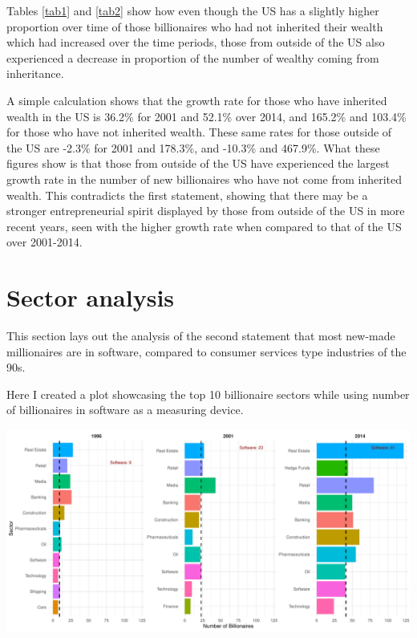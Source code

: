 \documentclass[11pt,preprint]{elsarticle}
\let\origfigure\figure
\let\endorigfigure\endfigure
\renewenvironment{figure}[1][2] {
    \expandafter\origfigure\expandafter[H]
} {
    \endorigfigure
}
\numberwithin{equation}{section}
\numberwithin{figure}{section}
\numberwithin{table}{section}
\begin{document}
Tables \ref{tab1} and \ref{tab2} show how even though the US has a
slightly higher proportion over time of those billionaires who had not
inherited their wealth which had increased over the time periods, those
from outside of the US also experienced a decrease in proportion of the
number of wealthy coming from inheritance.

A simple calculation shows that the growth rate for those who have
inherited wealth in the US is 36.2\% for 2001 and 52.1\% over 2014, and
165.2\% and 103.4\% for those who have not inherited wealth. These same
rates for those outside of the US are -2.3\% for 2001 and 178.3\%, and
-10.3\% and 467.9\%. What these figures show is that those from outside
of the US have experienced the largest growth rate in the number of new
billionaires who have not come from inherited wealth. This contradicts
the first statement, showing that there may be a stronger
entrepreneurial spirit displayed by those from outside of the US in more
recent years, seen with the higher growth rate when compared to that of
the US over 2001-2014.

\section{Sector analysis}\label{sector-analysis}

This section lays out the analysis of the second statement that most
new-made millionaires are in software, compared to consumer services
type industries of the 90s.

Here I created a plot showcasing the top 10 billionaire sectors while
using number of billionaires in software as a measuring device.

\begin{figure}[H]

{\centering \includegraphics[width=0.8\linewidth]{./output/fig3} 

}

\caption{Column plots showing the top 10 billionaire sectors over the 3 periods, using the number of software billionaires as a benchmark in each \label{Fig3}}\label{fig:unnamed-chunk-5}
\end{figure}
\end{document}

